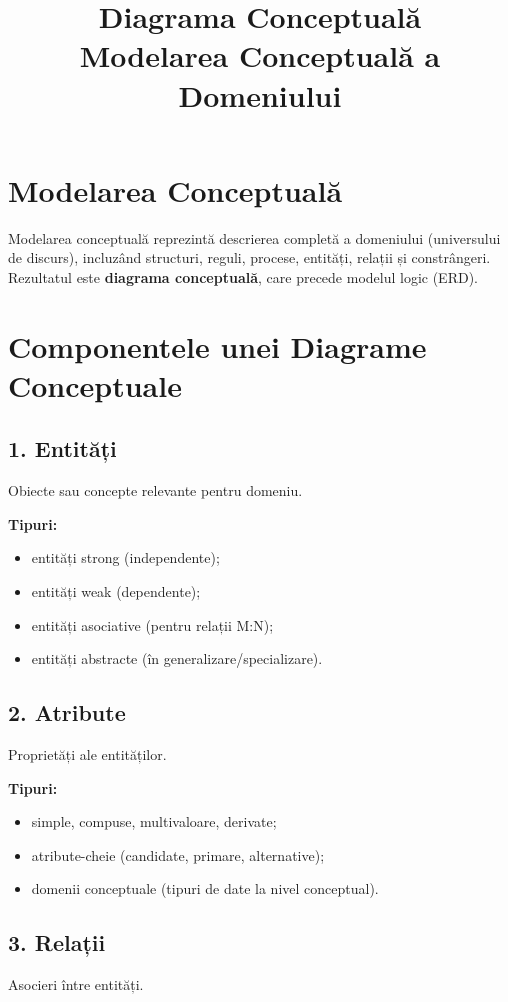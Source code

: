 \documentclass[12pt,a4paper]{article}
\title{Diagrama Conceptuală \\ Modelarea Conceptuală a Domeniului}
\author{}
\date{}
\begin{document}
\maketitle

\section{Modelarea Conceptuală}
Modelarea conceptuală reprezintă descrierea completă a domeniului (universului de
discurs), incluzând structuri, reguli, procese, entități, relații și constrângeri.
Rezultatul este \textbf{diagrama conceptuală}, care precede modelul logic (ERD).

\section{Componentele unei Diagrame Conceptuale}

\subsection*{1. Entități}
Obiecte sau concepte relevante pentru domeniu.

\textbf{Tipuri:}
\begin{itemize}[noitemsep]
    \item entități strong (independente);
    \item entități weak (dependente);
    \item entități asociative (pentru relații M:N);
    \item entități abstracte (în generalizare/specializare).
\end{itemize}

\subsection*{2. Atribute}
Proprietăți ale entităților.

\textbf{Tipuri:}
\begin{itemize}[noitemsep]
    \item simple, compuse, multivaloare, derivate;
    \item atribute-cheie (candidate, primare, alternative);
    \item domenii conceptuale (tipuri de date la nivel conceptual).
\end{itemize}

\subsection*{3. Relații}
Asocieri între entități.
\end{document}
